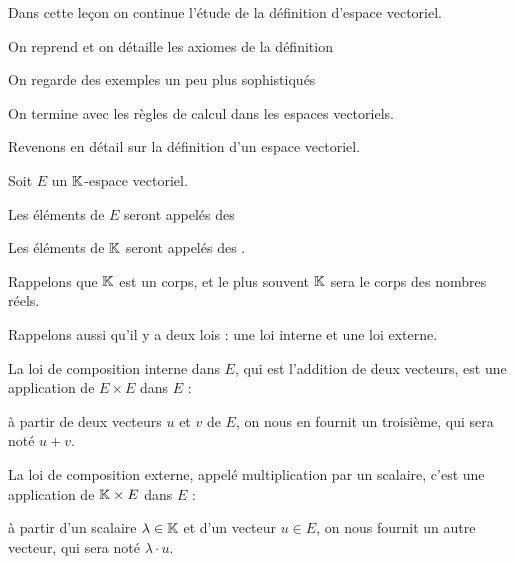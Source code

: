 







\debuttexte


\diapo

Dans cette leçon on continue l'étude de la définition d'espace vectoriel.

\change

\change

On reprend et on détaille les axiomes de la définition

\change

On regarde des exemples un peu plus sophistiqués

\change

On termine avec les règles de calcul dans les espaces vectoriels.

\diapo

Revenons en détail sur la définition d'un espace vectoriel.

Soit $E$ un $\mathbb{K}$-espace vectoriel.


Les éléments de $E$ seront appelés des 


Les éléments de $\mathbb{K}$ seront appelés des .

Rappelons que $\mathbb{K}$ est un corps, et le plus souvent $\mathbb{K}$ sera le corps des nombres réels.

\change

Rappelons aussi qu'il y a deux lois : une loi interne et une loi externe.


La loi de composition interne dans $E$, qui est l'addition de deux vecteurs, 
est une application de $E \times E$ dans $E$ :

à partir de deux vecteurs $u$ et $v$ de $E$, 
on nous en fournit un troisième, qui sera noté $u+v$.

\change


La loi de composition externe, appelé multiplication par un scalaire,
 c'est une application de $\mathbb{K} \times E$ dans $E$ : 

à partir d'un scalaire $\lambda \in \mathbb{K}$ et d'un vecteur $u \in E$, on nous
fournit un autre vecteur, qui sera noté $\lambda\cdot u$.




